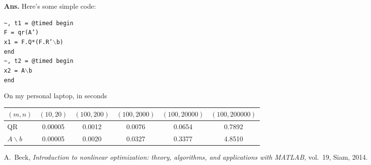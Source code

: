 \documentclass{article}
\newcommand{\showsolution}[1]{\textbf{Ans.}\;#1}
\begin{document}
\begin{enumerate}
\begin{enumerate}
	
	\showsolution{
		Here's some simple code:
		
		\texttt{\~{}, t1 = @timed begin\\
        F = qr(A') \\
        x1 = F.Q*(F.R'$\backslash$b)\\
    	end\\ \newline
    	\~{}, t2 = @timed begin\\
        x2 = A$\backslash$b \\
		end\\}   
	
		
		On my personal laptop, in seconds
		
		\begin{tabular}{|l|ccccc|}
			\hline
			$(m,n)$ &  $(10,20)$& $(100,200)$& $(100,2000)$&  $(100,20000)$ & $(100,200000)$\\
			\hline
			QR				& 0.00005 & 0.0012 & 0.0076 & 0.0654 & 0.7892\\
			$A\backslash b$	& 0.00005 & 0.0020 & 0.0327 & 0.3377 & 4.8510\\
			\hline
		\end{tabular}
	
		}

\end{enumerate}



\end{enumerate}
\begin{thebibliography}{1}
	
	{\sc A.~Beck}, {\em Introduction to nonlinear optimization: theory, algorithms,
		and applications with MATLAB}, vol.~19, Siam, 2014.
	
\end{thebibliography}
\end{document}
